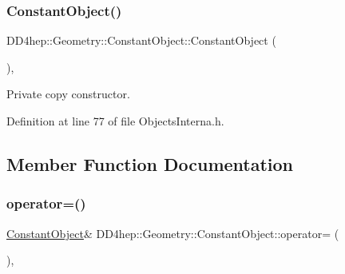\hypertarget{class_d_d4hep_1_1_geometry_1_1_constant_object_a9bc01ddd3487fdaf76be43bce415e0e9}{}\label{class_d_d4hep_1_1_geometry_1_1_constant_object_a9bc01ddd3487fdaf76be43bce415e0e9} 
\subsubsection{\texorpdfstring{Constant\+Object()}{ConstantObject()}\hspace{0.1cm}{\footnotesize\ttfamily [2/2]}}
{\footnotesize\ttfamily D\+D4hep\+::\+Geometry\+::\+Constant\+Object\+::\+Constant\+Object (\begin{DoxyParamCaption}\item[{const \hyperlink{class_d_d4hep_1_1_geometry_1_1_constant_object}{Constant\+Object} \&}]{ }\end{DoxyParamCaption})\hspace{0.3cm}{\ttfamily [inline]}, {\ttfamily [private]}}



Private copy constructor. 



Definition at line 77 of file Objects\+Interna.\+h.



\subsection{Member Function Documentation}
\hypertarget{class_d_d4hep_1_1_geometry_1_1_constant_object_acd8082f3aab755887e4bb77f1b730cf3}{}\label{class_d_d4hep_1_1_geometry_1_1_constant_object_acd8082f3aab755887e4bb77f1b730cf3} 
\subsubsection{\texorpdfstring{operator=()}{operator=()}}
{\footnotesize\ttfamily \hyperlink{class_d_d4hep_1_1_geometry_1_1_constant_object}{Constant\+Object}\& D\+D4hep\+::\+Geometry\+::\+Constant\+Object\+::operator= (\begin{DoxyParamCaption}\item[{const \hyperlink{class_d_d4hep_1_1_geometry_1_1_constant_object}{Constant\+Object} \&}]{ }\end{DoxyParamCaption})\hspace{0.3cm}{\ttfamily [inline]}, {\ttfamily [private]}}




